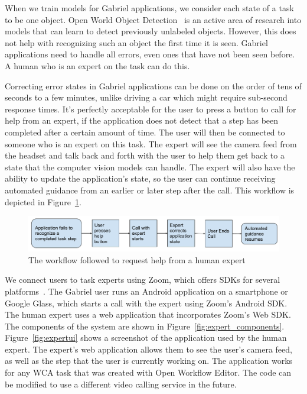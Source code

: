 When we train models for Gabriel applications, we consider each state of a task
to be one object. Open World Object Detection~\cite{joseph2021open} is an active
area of research into models that can learn to detect previously unlabeled
objects. However, this does not help with recognizing such an object the first
time it is seen. Gabriel applications need to handle all errors, even ones that
have not been seen before. A human who is an expert on the task can do this.

Correcting error states in Gabriel applications can be done on the order of tens
of seconds to a few
minutes, unlike driving a car which might require sub-second response times.
It's perfectly acceptable for the user to press a button to call for help from
an expert, if the application does not detect that a step has been completed
after a certain amount of time. The user will then be connected to someone who
is an expert on this task. The expert will
see the camera feed from the headset and talk back and forth with the user to
help them get back to a state that the computer vision models can handle.
The expert will also have the ability to update the application's state, so the
user can continue receiving automated guidance from an earlier or later
step after the call.
This workflow is depicted in Figure~\ref{fig:zoom_workflow}.

\begin{figure}[h]
  \includegraphics[width=\textwidth]{figures/zoom_workflow.pdf}
  \caption{
    The workflow followed to request help from a human expert
  }\label{fig:zoom_workflow}
\end{figure}

We connect users to task experts using Zoom, which offers SDKs for several
platforms~\cite{zoom}. The Gabriel user runs an Android application on a
smartphone or Google Glass, which starts a call with the expert using Zoom's
Android SDK.
The human expert uses a web application that incorporates Zoom's Web SDK.
The components of the system are shown in Figure~{\ref{fig:expert_components}}.
Figure~{\ref{fig:expertui}} shows a screenshot of the application used by the
human expert.
The expert's web application allows them to see the user's camera feed, as well
as the step that the user is currently working on.
The application works for any WCA task that was created with Open Workflow
Editor.
The code can be modified to use a different video calling service in the future.

